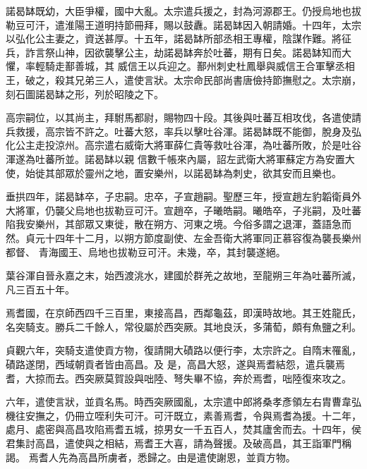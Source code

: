 \begin{pinyinscope}
 諾曷缽既幼，大臣爭權，國中大亂。太宗遣兵援之，封為河源郡王。仍授烏地也拔勒豆可汗，遣淮陽王道明持節冊拜，賜以鼓纛。諾曷缽因入朝請婚。十四年，太宗以弘化公主妻之，資送甚厚。十五年，諾曷缽所部丞相王專權，陰謀作難。將征兵，詐言祭山神，因欲襲擊公主，劫諾曷缽奔於吐蕃，期有日矣。諾曷缽知而大懼，率輕騎走鄯善城，其
 威信王以兵迎之。鄯州刺史杜鳳舉與威信王合軍擊丞相王，破之，殺其兄弟三人，遣使言狀。太宗命民部尚書唐儉持節撫慰之。太宗崩，刻石圖諾曷缽之形，列於昭陵之下。



 高宗嗣位，以其尚主，拜駙馬都尉，賜物四十段。其後與吐蕃互相攻伐，各遣使請兵救援，高宗皆不許之。吐蕃大怒，率兵以擊吐谷渾。諾曷缽既不能御，脫身及弘化公主走投涼州。高宗遣右威衛大將軍薛仁貴等救吐谷渾，為吐蕃所敗，於是吐谷渾遂為吐蕃所並。諾曷缽以親
 信數千帳來內屬，詔左武衛大將軍蘇定方為安置大使，始徙其部眾於靈州之地，置安樂州，以諾曷缽為刺史，欲其安而且樂也。



 垂拱四年，諾曷缽卒，子忠嗣。忠卒，子宣趙嗣。聖歷三年，授宣趙左豹韜衛員外大將軍，仍襲父烏地也拔勒豆可汗。宣趙卒，子曦皓嗣。曦皓卒，子兆嗣，及吐蕃陷我安樂州，其部眾又東徙，散在朔方、河東之境。今俗多謂之退渾，蓋語急而然。貞元十四年十二月，以朔方節度副使、左金吾衛大將軍同正慕容復為襲長樂州都督、
 青海國王、烏地也拔勒豆可汗。未幾，卒，其封襲遂絕。



 葉谷渾自晉永嘉之末，始西渡洮水，建國於群羌之故地，至龍朔三年為吐蕃所滅，凡三百五十年。



 焉耆國，在京師西四千三百里，東接高昌，西鄰龜茲，即漢時故地。其王姓龍氏，名突騎支。勝兵二千餘人，常役屬於西突厥。其地良沃，多蒲萄，頗有魚鹽之利。



 貞觀六年，突騎支遣使貢方物，復請開大磧路以便行李，太宗許之。自隋末罹亂，磧路遂閉，西域朝貢者皆由高昌。及
 是，高昌大怒，遂與焉耆結怨，遣兵襲焉耆，大掠而去。西突厥莫賀設與咄陸、弩失畢不協，奔於焉耆，咄陸復來攻之。



 六年，遣使言狀，並貢名馬。時西突厥國亂，太宗遣中郎將桑孝彥領左右胄曹韋弘機往安撫之，仍冊立咥利失可汗。可汗既立，素善焉耆，令與焉耆為援。十二年，處月、處密與高昌攻陷焉耆五城，掠男女一千五百人，焚其廬舍而去。十四年，侯君集討高昌，遣使與之相結，焉耆王大喜，請為聲援。及破高昌，其王詣軍門稱謁。
 焉耆人先為高昌所虜者，悉歸之。由是遣使謝恩，並貢方物。




\end{pinyinscope}
